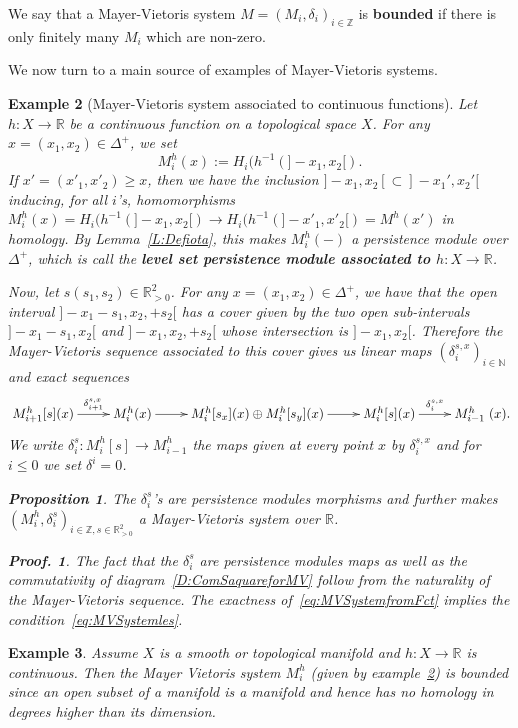 \documentclass[a4paper, english, 11pt]{article}
\newcommand{\0}{\vec{0}}
\newcommand{\R}[0]{\mathbb{R}}
\newcommand{\N}[0]{\mathbb{N}}
\newcommand{\Z}[0]{\mathbb{Z}}
\newtheorem{prop}{Proposition}[section]
\newtheorem*{pf}{Proof.} }
\newtheorem{ex}[prop]{Example}
\begin{document}
 We say that a Mayer-Vietoris system $M=(M_i,\delta_i)_{i\in \Z}$ is \textbf{bounded} if there is only finitely many $M_i$ which are non-zero.
 
 
 

We now turn to a main source of examples of Mayer-Vietoris systems. 
\begin{ex}[Mayer-Vietoris system associated to continuous functions]\label{Ex:MVfromFct}
Let $h: X\to \R$ be a continuous function on a topological space $X$. For any $
x=(x_1,x_2)\in \Delta^+$, we 
 set $$M_i^h(x):= H_i(h^{-1}(]-x_1, x_2[).$$
 If $x'=(x'_1, x'_2)\geq x$, then we have the inclusion $]-x_1, x_2[\subset ]-x_1', x_2'[$ inducing, for all $i$'s, homomorphisms $M_i^h(x)=H_i(h^{-1}(]-x_1, x_2[) \to H_i(h^{-1}(]-x'_1, x'_2[)= M^h(x')$ in homology. 
 By Lemma~\ref{L:Defiota}, this makes $M_i^h(-)$ a persistence module over $\Delta^+$, which is call the \textbf{level set persistence module associated to $h:X\to \R$}. 
 
 \smallskip
 
 Now, let $s(s_1,s_2) \in \R^2_{>0}$. For any $x=(x_1,x_2)\in \Delta^+$, we have that the open interval $]-x_1-s_1, x_2,+s_2[ $ has a cover given by the two open sub-intervals $]-x_1-s_1, x_2[$ and $]-x_1, x_2,+s_2[ $ whose intersection is $]-x_1, x_2[$. Therefore the Mayer-Vietoris sequence associated to this cover gives us linear maps $(\delta_{i}^{s,x})_{i\in \N}$ and exact sequences 
  \begin{equation}\xymatrix{M^h_{i+1}[s](x) \ar[r]^-{\delta_{i+1}^{s,x}} & M^h_i(x) \ar[r] & M^h_i[s_x](x) \oplus M^h_i[s_y](x) \ar[r] & M^h_i[s](x) \ar[r]^-{\delta_{i}^{s,x}} & M^h_{i-1}}(x).\label{eq:MVSystemfromFct}\end{equation}
  We write $\delta^s_i: M_i^h[s] \to M_{i-1}^h$ the maps given at every point $x$ by $\delta_i^{s,x}$ and for $i\leq 0$ we set $\delta^i=0$.
  \begin{prop}\label{P:MVfromFct}
  The  $\delta^s_i$'s are persistence modules morphisms and further makes $(M^h_i, \delta^s_i)_{i\in \Z, s\in \R^2_{>0}}$ a Mayer-Vietoris system over $\R$.
  \end{prop}
  \begin{pf}
  The fact that the $\delta^s_i$ are persistence modules maps as well as the commutativity of diagram~\eqref{D:ComSaquareforMV} follow from the naturality of the Mayer-Vietoris sequence. The exactness of~\eqref{eq:MVSystemfromFct} implies the condition~\eqref{eq:MVSystemles}.
  \end{pf}
\end{ex}
\begin{ex}
 Assume $X$ is a smooth or topological manifold and $h: X\to \R$ is continuous. Then the Mayer Vietoris system $M_i^h$ (given by example~\ref{Ex:MVfromFct}) is bounded since an open subset of a manifold is a manifold and hence has no homology in degrees higher than its dimension.  
\end{ex}
\end{document}
